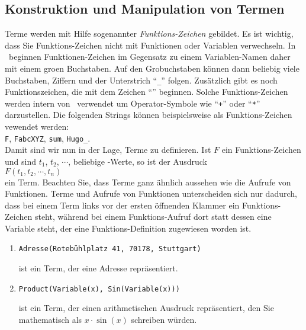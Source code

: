 \subsection{Konstruktion und Manipulation von Termen}
Terme werden mit Hilfe sogenannter \emph{Funktions-Zeichen} gebildet.  Es ist wichtig,
dass Sie Funktions-Zeichen nicht mit Funktionen oder Variablen verwechseln.  In \setl\
beginnen Funktionen-Zeichen im Gegensatz zu einem Variablen-Namen daher mit einem gro\3en
Buchstaben.  Auf den Gro\3buchstaben k\"{o}nnen  dann beliebig viele Buchstaben, Ziffern und
der Unterstrich ``\texttt{\_}'' folgen.
Zus\"{a}tzlich gibt es noch Funktionszeichen, die mit dem Zeichen
``\texttt{\symbol{94}}''
beginnen.  Solche Funktions-Zeichen werden intern von \setl\ verwendet um Operator-Symbole
wie ``\texttt{+}'' oder ``\texttt{*}'' darzustellen.
Die folgenden Strings k\"{o}nnen beispielsweise  als Funktions-Zeichen vewendet werden:
\\[0.2cm]
\hspace*{1.3cm}
\texttt{F}, \quad \texttt{FabcXYZ}, \quad \texttt{sum}, \quad \texttt{Hugo\_}.
\\[0.2cm]
Damit sind wir nun in der Lage, Terme zu definieren.  Ist $F$ ein Funktions-Zeichen und sind
$t_1$, $t_2$, $\cdots$, beliebige \setl-Werte, so ist der Ausdruck
\\[0.2cm]
\hspace*{1.3cm}
$F(t_1, t_2, \cdots, t_n)$
\\[0.2cm]
ein Term.  Beachten Sie, dass Terme ganz \"{a}hnlich aussehen wie die Aufrufe von Funktionen.
Terme und Aufrufe von Funktionen unterscheiden sich nur dadurch, dass bei einem Term links
vor der ersten \"{o}ffnenden Klammer ein Funktions-Zeichen steht, w\"{a}hrend bei einem
Funktions-Aufruf dort statt dessen eine Variable steht, der eine Funktions-Definition zugewiesen
worden ist.

\examples
\begin{enumerate}
\item \texttt{Adresse(Roteb\"{u}hlplatz 41, 70178, Stuttgart)}

      ist ein Term, der eine Adresse repr\"{a}sentiert.
\item \texttt{Product(Variable(x), Sin(Variable(x\symbol{34})))}

      ist ein Term, der einen arithmetischen Ausdruck repr\"{a}sentiert, den Sie mathematisch
      als $x \cdot \sin(x)$ schreiben w\"{u}rden.  \eox
\end{enumerate}

